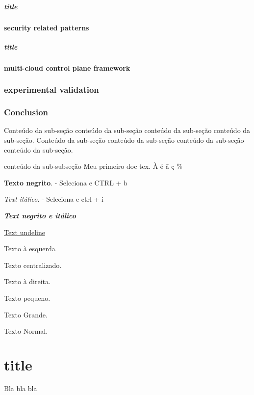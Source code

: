 \documentclass[12pt]{article}
\begin{document}
	\subsubsection{title}

	\subsection{security related patterns}

    \subsubsection{title}
	
	\subsection{multi-cloud control plane framework}
	
	\section{experimental validation}
	
	\section{Conclusion}
		
	Conteúdo da sub-seção conteúdo da sub-seção conteúdo da sub-seção conteúdo da sub-seção.
	\noindent Conteúdo da sub-seção conteúdo da sub-seção conteúdo da sub-seção conteúdo da sub-seção.
   
    conteúdo da sub-subseção
	Meu primeiro doc tex. À é ã ç \%
	
	\textbf{Texto negrito}. - Seleciona e CTRL + b
	
	\textit{Text itálico}. - Seleciona e ctrl + i
	
	\textbf{\textit{Text negrito e itálico}}
	
	\underline{Text undeline} 
	
	\begin{flushleft}
		Texto à esquerda
	\end{flushleft}
	
	\begin{center}
		Texto centralizado.
	\end{center}
	
	\begin{flushright}
		Texto à direita.
	\end{flushright}
	
	{\tiny Texto pequeno.}
	
	{\LARGE Texto Grande.}
	
	Texto Normal.
	
	\newpage
	
	\part[test]{title}
	Bla bla bla
\end{document}
